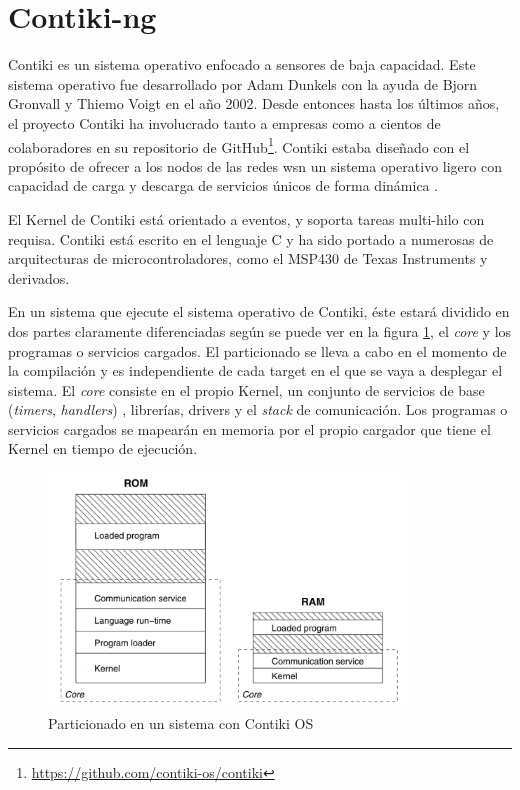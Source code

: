 \section{Contiki-ng}
\label{contikiNG}

Contiki es un sistema operativo enfocado a sensores de baja capacidad. Este sistema operativo fue desarrollado por Adam Dunkels con la ayuda de  Bjorn Gronvall y Thiemo Voigt en el año 2002. Desde entonces hasta los últimos años, el proyecto Contiki  ha involucrado tanto a empresas como a cientos de colaboradores en su repositorio de GitHub\footnote{\url{https://github.com/contiki-os/contiki}}.  Contiki estaba diseñado con el propósito de ofrecer a los nodos de las redes \gls{wsn} un sistema operativo ligero con capacidad de carga y descarga de servicios únicos de forma dinámica \cite{1367266}. \\
\par
El Kernel de Contiki está orientado a eventos, y soporta tareas multi-hilo con requisa. Contiki está escrito en el lenguaje C y ha sido portado a numerosas de arquitecturas de microcontroladores, como el MSP430 de Texas Instruments y derivados. \\
\par

En un sistema que ejecute el sistema operativo de Contiki, éste estará dividido en dos partes claramente diferenciadas según se puede ver en la figura \ref{fig:contikiParts}, el \textit{core} y los programas o servicios cargados. El particionado se lleva a cabo en el momento de la compilación y es independiente de cada target en el que se vaya a desplegar el sistema. El \textit{core} consiste en el propio Kernel, un conjunto de servicios de base (\textit{timers}, \textit{handlers}) , librerías, drivers y el \textit{stack} de comunicación. Los programas o servicios cargados se mapearán en memoria por el propio cargador que tiene el Kernel en tiempo de ejecución.\\
\par


\begin{figure}[ht]
    \centering
    \includegraphics[width=9.5cm]{archivos/img/teoria/contiki.png}
    \caption{Particionado en un sistema con Contiki OS \cite{1367266}}
    \label{fig:contikiParts}
\end{figure}

